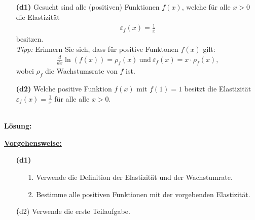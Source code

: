 \subsection*{}
\begin{enumerate}
	\item[\textbf{(d1)}]
	Gesucht sind alle (positiven) Funktionen $ f(x) $, welche für alle $ x > 0 $ die Elastizität
	\begin{align*}
		\varepsilon_f(x) = \frac{1}{x}
	\end{align*}
	besitzen.\\
	\textit{Tipp:} Erinnern Sie sich, dass für positive Funktonen $ f(x) $ gilt:
	\begin{align*}
		\frac{d}{dx} \ln(f(x)) = \rho_f(x) 
		\ \textrm{und} \
		\varepsilon_f(x) = x \cdot \rho_f(x),
	\end{align*}
	wobei $ \rho_f $ die Wachstumsrate von $ f $ ist.
	\item[\textbf{(d2)}]
	Welche positive Funktion $ f(x) $ mit $ f(1) = 1 $ besitzt die Elastizität $ \varepsilon_f(x) = \frac{1}{x} $ für alle alle $ x >0 $.
\end{enumerate}
\ \\
\textbf{Lösung:}
\begin{mdframed}
\underline{\textbf{Vorgehensweise:}}
\begin{enumerate}
\item[\textbf{(d1)}]
\begin{enumerate}
	\item[1.] Verwende die Definition der Elastizität und der Wachstumrate.
	\item[2.] 
	Bestimme alle positiven Funktionen mit der vorgebenden Elastizität.
\end{enumerate}
\item[\textbf(d2)] 
Verwende die erste Teilaufgabe.
\end{enumerate}
\end{mdframed}

